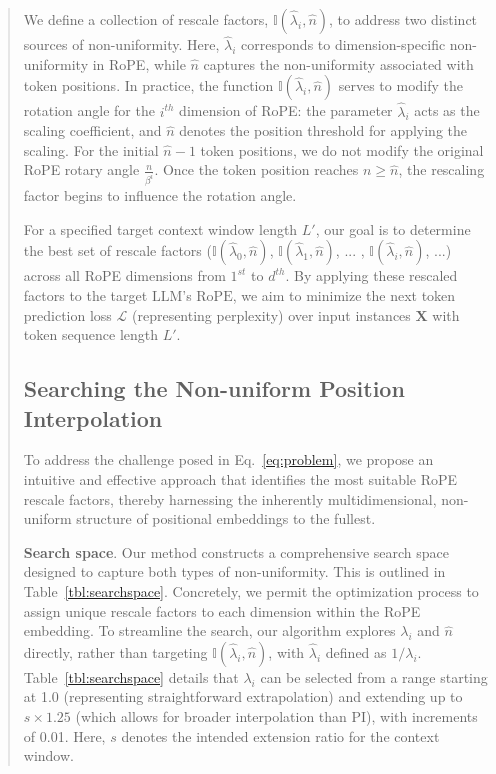 \begin{abstract}
We define a collection of rescale factors, $\mathbb{I}(\hat{\lambda}_{i},\hat{n})$, to address two distinct sources of non-uniformity. Here, $\hat{\lambda}_i$ corresponds to dimension-specific non-uniformity in RoPE, while $\hat{n}$ captures the non-uniformity associated with token positions. In practice, the function $\mathbb{I}(\hat{\lambda}_{i},\hat{n})$ serves to modify the rotation angle for the $i^{th}$ dimension of RoPE: the parameter $\hat{\lambda}_i$ acts as the scaling coefficient, and $\hat{n}$ denotes the position threshold for applying the scaling. For the initial $\hat{n}-1$ token positions, we do not modify the original RoPE rotary angle $\frac{n}{\beta^i}$. Once the token position reaches $n \geq \hat{n}$, the rescaling factor begins to influence the rotation angle.

For a specified target context window length $L'$, our goal is to determine the best set of rescale factors ($\mathbb{I}(\hat{\lambda}_{0},\hat{n})$, $\mathbb{I}(\hat{\lambda}_{1},\hat{n})$, ... , $\mathbb{I}(\hat{\lambda}_{i},\hat{n})$, ...) across all RoPE dimensions from $1^{st}$ to $d^{th}$. By applying these rescaled factors to the target $\text{LLM}$’s $\text{RoPE}$, we aim to minimize the next token prediction loss $\mathcal{L}$ (representing perplexity) over input instances $\mathbf{X}$ with token sequence length $L'$.

\subsection{Searching the Non-uniform Position Interpolation}

To address the challenge posed in Eq.~\ref{eq:problem}, we propose an intuitive and effective approach that identifies the most suitable RoPE rescale factors, thereby harnessing the inherently multidimensional, non-uniform structure of positional embeddings to the fullest.

\textbf{Search space}. Our method constructs a comprehensive search space designed to capture both types of non-uniformity. This is outlined in Table~\ref{tbl:searchspace}. Concretely, we permit the optimization process to assign unique rescale factors to each dimension within the RoPE embedding. To streamline the search, our algorithm explores $\lambda_i$ and $\hat{n}$ directly, rather than targeting $\mathbb{I}(\hat{\lambda}_{i},\hat{n})$, with $\hat{\lambda}_{i}$ defined as $1/\lambda_i$. Table~\ref{tbl:searchspace} details that $\lambda_i$ can be selected from a range starting at 1.0 (representing straightforward extrapolation) and extending up to $s\times1.25$ (which allows for broader interpolation than PI), with increments of 0.01. Here, $s$ denotes the intended extension ratio for the context window.


\end{abstract}
